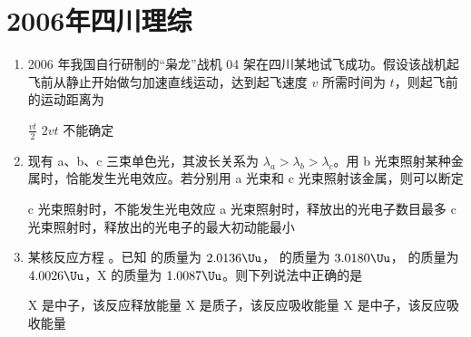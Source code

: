 \documentclass[\gkver]{gaokaozhenti}
\begin{document}
\chapter{2006年四川理综}

\begin{enumerate}
\item
2006 年我国自行研制的“枭龙”战机 04 架在四川某地试飞成功。假设该战机起飞前从静止开始做匀加速直线运动，达到起飞速度 $v$ 所需时间为 $t$，则起飞前的运动距离为

{$\frac{vt}{2}$}
{$2vt$}
{不能确定}


\item
现有 a、b、c 三束单色光，其波长关系为 $\lambda_{a} > \lambda_{b} > \lambda_{c}$。用 b 光束照射某种金属时，恰能发生光电效应。若分别用 a 光束和 c 光束照射该金属，则可以断定

{c 光束照射时，不能发生光电效应}
{a 光束照射时，释放出的光电子数目最多}
{c 光束照射时，释放出的光电子的最大初动能最小}


\item
某核反应方程 。已知  的质量为 $2.0136\Uu$， 的质量为 $3.0180\Uu$， 的质量为 $4.0026\Uu$，X 的质量为 $1.0087\Uu$。则下列说法中正确的是

{X 是中子，该反应释放能量}
{X 是质子，该反应吸收能量}
{X 是中子，该反应吸收能量}


\end{enumerate}
\end{document}
